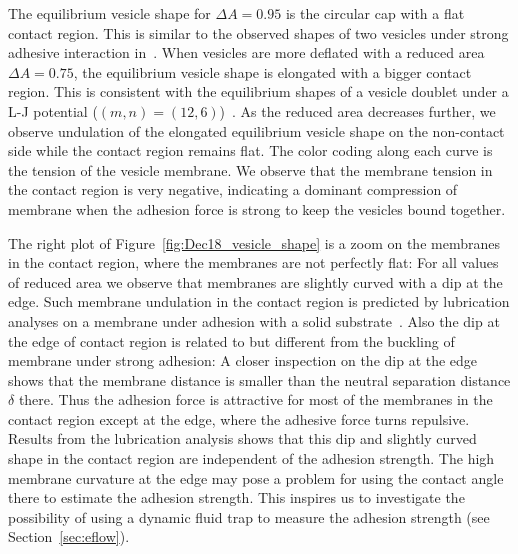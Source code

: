 \documentclass[prf,superscriptaddress,showpacs]{revtex4-1}
\begin{document}
The equilibrium vesicle shape for $\Delta A=0.95$ is the circular cap
with a flat contact region.  This is similar to the observed shapes of
two vesicles under strong adhesive interaction
in~\cite{RamachandranAndersonLealIsraelachvili2010_Langmuir}.  When
vesicles are more deflated with a reduced area $\Delta A = 0.75$, the
equilibrium vesicle shape is elongated with a bigger contact region.
This is consistent with the equilibrium shapes of a vesicle doublet
under a L-J potential ($(m,n) =
(12,6)$)~\cite{FlormannAouane2017_SciReports}.  As the reduced area
decreases further, we observe undulation of the elongated equilibrium
vesicle shape on the non-contact side while the contact region remains
flat.  The color coding along each curve is the tension of the vesicle
membrane.  We observe that the membrane tension in the contact region is
very negative, indicating a dominant compression of membrane when the
adhesion force is strong to keep the vesicles bound together.

The right plot of Figure~\ref{fig:Dec18_vesicle_shape} is a zoom on the
membranes in the contact region, where the membranes are not perfectly
flat: For all values of reduced area we observe that membranes are
slightly curved with a dip at the edge.  Such membrane undulation in the
contact region is predicted by lubrication analyses on a membrane
under adhesion with a solid substrate~\cite{BlountMiksisDavis2013_PRSa,
YoungStone2017_PRF}.  Also the dip at the edge of contact region is
related to but different from the buckling of membrane under strong
adhesion: A closer inspection on the dip at the edge shows that the
membrane distance is smaller than the neutral separation distance
$\delta$ there. Thus the adhesion force is attractive for most of the
membranes in the contact region except at the edge, where the adhesive
force turns repulsive.  Results from the lubrication analysis shows that
this dip and slightly curved shape in the contact region are independent
of the adhesion strength. The high membrane curvature at the edge may
pose a problem for using the contact angle there to estimate the
adhesion strength. This inspires us to investigate the possibility of
using a dynamic fluid trap to measure the adhesion strength (see
Section~\ref{sec:eflow}).
\end{document}

